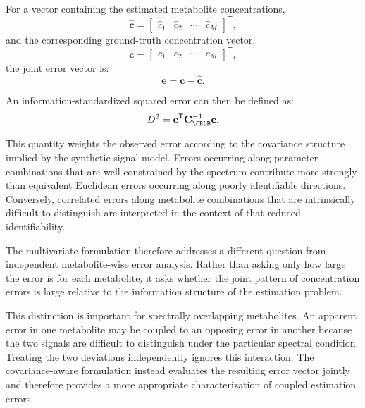 For a vector containing the estimated metabolite concentrations,
\begin{equation}
    \hat{\mathbf{c}} = 
    \begin{bmatrix}
        \hat{c}_1 &
        \hat{c}_2 &
        \cdots &
        \hat{c}_M
    \end{bmatrix}^{\mathsf{T}},
\end{equation}
and the corresponding ground-truth concentration vector,
\begin{equation}
    \mathbf{c} = 
    \begin{bmatrix}
        c_1 &
        c_2 &
        \cdots &
        c_M
    \end{bmatrix}^{\mathsf{T}},
\end{equation}
the joint error vector is:
\begin{equation}
    \mathbf{e} = \mathbf{c} - \hat{\mathbf{c}}.
\end{equation}

An information-standardized squared error can then be defined as:
\begin{equation}
    D^{2} = \mathbf{e}^{\mathsf{T}}\mathbf{C}_{\CRLB}^{-1}\mathbf{e}.
\end{equation}

This quantity weights the observed error according to the covariance structure implied by the synthetic signal model. Errors occurring along parameter combinations that are well constrained by the spectrum contribute more strongly than equivalent Euclidean errors occurring along poorly identifiable directions. Conversely, correlated errors along metabolite combinations that are intrinsically difficult to distinguish are interpreted in the context of that reduced identifiability.

The multivariate formulation therefore addresses a different question from independent metabolite-wise error analysis. Rather than asking only how large the error is for each metabolite, it asks whether the joint pattern of concentration errors is large relative to the information structure of the estimation problem.

This distinction is important for spectrally overlapping metabolites. An apparent error in one metabolite may be coupled to an opposing error in another because the two signals are difficult to distinguish under the particular spectral condition. Treating the two deviations independently ignores this interaction. The covariance-aware formulation instead evaluates the resulting error vector jointly and therefore provides a more appropriate characterization of coupled estimation errors.

